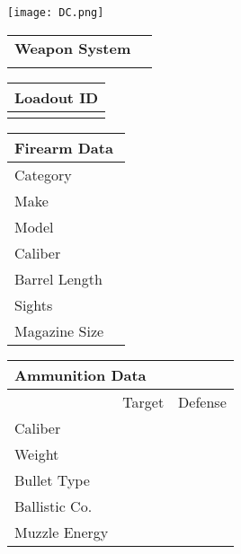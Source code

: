 \documentclass[Cover.tex]{subfiles}
\begin{document}
	\begin{minipage}[t][0.15\textheight][t]{0.1\textwidth} 
		\texttt{[image: DC.png]}
	\end{minipage}
	\hfill
	\begin{minipage}[t][0.25\textheight][t]{0.85\textwidth}
		\begin{tabular}{ p{} l  }
			\\		
			\large \textbf{Weapon System} \\
			\\[0.09\textheight]
		\end{tabular}
		\quad
		\begin{tabular}{ | p{} |}
			\hline
			Loadout ID\\ 
			\hline
			\\[0.05\textheight]
			\hline
		\end{tabular}
	\end{minipage}
	
	\begin{tabular}[t]{| p{} | p{} |}
		\hline
		\multicolumn{2}{|l|}{\textbf{Firearm Data}} \\
		\hline
	    Category & \\[0.03\textheight]
		\hline
	    Make & \\[0.03\textheight]
	    \hline
	    Model & \\[0.03\textheight]
	    \hline
	    Caliber & \\[0.03\textheight]
	    \hline 
	    Barrel Length & \\[0.03\textheight]
	    \hline 
	    Sights & \\[0.03\textheight]
	    \hline 
	    Magazine Size & \\[0.03\textheight]
	    \hline        
	\end{tabular}
	\quad
	\begin{tabular}[t]{| p{} | p{} | p{} |}
		\hline
		\multicolumn{3}{|l|}{\textbf{Ammunition Data}} \\
		\hline
	     & Target & Defense \\[0.04\textheight]
		\hline
	    Caliber & & \\[0.04\textheight]
	    \hline
	    Weight & & \\[0.04\textheight]
	    \hline
	    \small Bullet Type & & \\[0.04\textheight]
	    \hline 
	    \small Ballistic Co. & & \\[0.04\textheight]
	    \hline 
	    \small Muzzle Energy & & \\[0.04\textheight]
	    \hline 
	\end{tabular}
\end{document}
